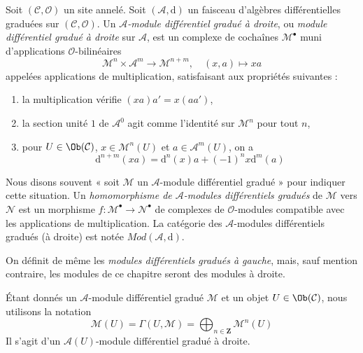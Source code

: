 \begin{definition}
\label{definition-dgm}
Soit $(\mathcal{C}, \mathcal{O})$ un site annelé. Soit
$(\mathcal{A}, \text{d})$ un faisceau d'algèbres différentielles graduées sur
$(\mathcal{C}, \mathcal{O})$. Un
{\it $\mathcal{A}$-module différentiel gradué à droite}, ou
{\it module différentiel gradué à droite} sur $\mathcal{A}$, est un
complexe de cochaînes $\mathcal{M}^\bullet$ muni d'applications
$\mathcal{O}$-bilinéaires
$$
\mathcal{M}^n \times \mathcal{A}^m \to \mathcal{M}^{n + m},\quad (x,
a) \longmapsto xa
$$
appelées applications de multiplication, satisfaisant aux propriétés
suivantes : \begin{enumerate}
\item la multiplication vérifie $(xa)a' = x(aa')$,
\item la section unité $1$ de $\mathcal{A}^0$
agit comme l'identité sur $\mathcal{M}^n$ pour tout $n$,
\item pour $U \in \Ob(\mathcal{C})$, $x \in \mathcal{M}^n(U)$ et
$a \in \mathcal{A}^m(U)$, on a
$$
\text{d}^{n + m}(xa) = \text{d}^n(x)a + (-1)^n x\text{d}^m(a)
$$
\end{enumerate} Nous
disons souvent « soit $\mathcal{M}$ un
$\mathcal{A}$-module différentiel gradué » pour indiquer cette situation. Un
{\it homomorphisme de $\mathcal{A}$-modules différentiels gradués} de
$\mathcal{M}$ vers $\mathcal{N}$ est un morphisme
$f : \mathcal{M}^\bullet \to \mathcal{N}^\bullet$ de complexes de
$\mathcal{O}$-modules compatible avec les applications de multiplication.
La catégorie des $\mathcal{A}$-modules différentiels gradués (à
droite) est notée $\textit{Mod}(\mathcal{A}, \text{d})$.
\end{definition}

\noindent
On définit de même les {\it modules différentiels gradués à gauche}, mais, sauf mention
contraire, les modules de ce chapitre seront des modules à droite.

\medskip\noindent
Étant donnés un $\mathcal{A}$-module différentiel gradué $\mathcal{M}$
et un objet $U \in \Ob(\mathcal{C})$, nous utilisons la notation
$$
\mathcal{M}(U)
= \Gamma(U, \mathcal{M})
= \bigoplus\nolimits_{n \in \mathbf{Z}} \mathcal{M}^n(U)
$$
Il s'agit d'un $\mathcal{A}(U)$-module différentiel gradué à droite.

